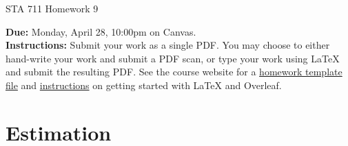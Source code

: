 \documentclass[11pt]{article}
\begin{document}
\begin{center}
\Large
STA 711 Homework 9\\
\normalsize
\vspace{5mm}
\end{center}
\noindent \textbf{Due:} Monday, April 28, 10:00pm on Canvas.\\ 

\noindent \textbf{Instructions:} Submit your work as a single PDF. You may choose to either hand-write your work and submit a PDF scan, or type your work using LaTeX and submit the resulting PDF. See the course website for a \href{https://sta711-s25.github.io/homework/hw_template.tex}{homework template file} and \href{https://sta711-s25.github.io/homework/latex_instructions/}{instructions} on getting started with LaTeX and Overleaf.

\section*{Estimation}
\end{document}

